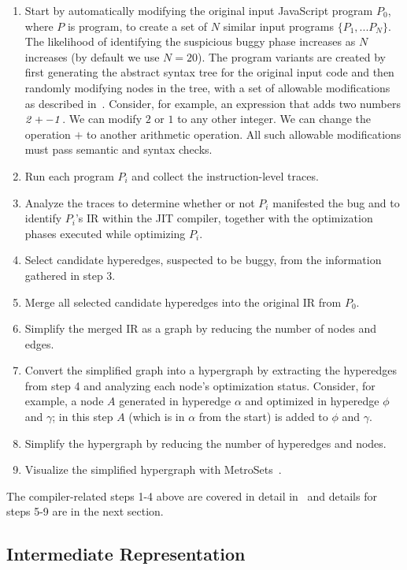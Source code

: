 \documentclass[runningheads]{llncs}
\begin{document}
\begin{enumerate}
\item Start by automatically modifying the original input JavaScript program $P_0$, where $P$ is program, to create a set of $N$ similar input programs $\{P_1,...P_N\}$. The likelihood of identifying the suspicious buggy phase increases as $N$ increases (by default we use $N=20$). The program variants are created by first generating the abstract syntax tree for the original input code and then randomly modifying nodes in the tree, with a set of allowable modifications as described in~\cite{DBLP:conf/vee/LimD21}. Consider, for example, an expression that adds two numbers $\it 2 + -1$. We can modify $2$ or $1$ to any other integer. We can change the operation $+$ to another arithmetic operation. All such allowable modifications must pass semantic and syntax checks.
\item Run each program $P_i$ and collect the instruction-level traces.
\item Analyze the traces to determine whether or not $P_i$ manifested the bug and to identify $P_i$'s IR within the JIT compiler, together with the optimization phases executed while optimizing $P_i$.
\item Select candidate hyperedges, suspected to be buggy, from the information gathered in step 3.
\item Merge all selected candidate hyperedges into the original IR from $P_0$.
\item Simplify the merged IR as a graph by reducing the number of nodes and edges.
\item Convert the simplified graph into a hypergraph by extracting the hyperedges from step 4 and analyzing each node's optimization status. Consider, for example, a node $A$  generated in hyperedge $\alpha$ and optimized in hyperedge $\phi$ and $\gamma$; in this step $A$ (which is in $\alpha$ from the start) is added to $\phi$ and $\gamma$.
\item Simplify the hypergraph by reducing the number of hyperedges and nodes.
\item Visualize the simplified hypergraph with MetroSets~\cite{DBLP:journals/tvcg/JacobsenWKN21}.
\end{enumerate}

The compiler-related  steps 1-4 above are covered in detail  in~\cite{DBLP:conf/vee/LimD21} and details for steps 5-9 are in the next section.
%
\subsection{Intermediate Representation}\label{sec:ir_generation}
\end{document}
